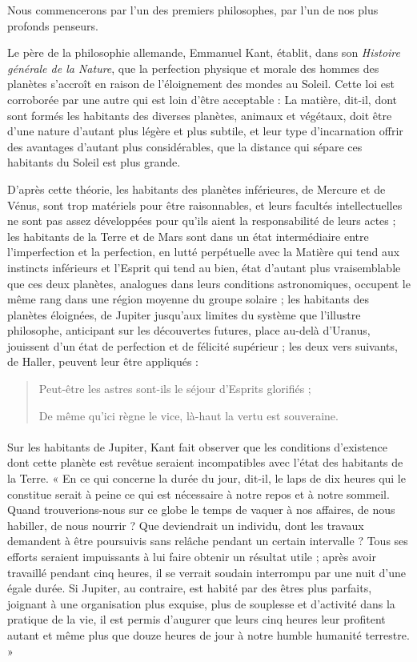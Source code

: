 \documentclass[a4paper, 11pt, oneside]{article}
\begin{document}
Nous commencerons par l'un des premiers philosophes, par l'un de nos plus profonds penseurs.

Le père de la philosophie allemande, Emmanuel Kant, établit, dans son \emph{Histoire générale de la Nature}, que la perfection physique et morale des hommes des planètes s'accroît en raison de l'éloignement des mondes au Soleil. Cette loi est corroborée par une autre qui est loin d'être acceptable : La matière, dit-il, dont sont formés les habitants des diverses planètes, animaux et végétaux, doit être d'une nature d'autant plus légère et plus subtile, et leur type d'incarnation offrir des avantages d'autant plus considérables, que la distance qui sépare ces habitants du Soleil est plus grande.

D'après cette théorie, les habitants des planètes inférieures, de Mercure et de Vénus, sont trop matériels pour être raisonnables, et leurs facultés intellectuelles ne sont pas assez développées pour qu'ils aient la responsabilité de leurs actes ; les habitants de la Terre et de Mars sont dans un état intermédiaire entre l'imperfection et la perfection, en lutté perpétuelle avec la Matière qui tend aux instincts inférieurs et l'Esprit qui tend au bien, état d'autant plus vraisemblable que ces deux planètes, analogues dans leurs conditions astronomiques, occupent le même rang dans une région moyenne du groupe solaire ; les habitants des planètes éloignées, de Jupiter jusqu'aux limites du système que l'illustre philosophe, anticipant sur les découvertes futures, place au-delà d'Uranus, jouissent d'un état de perfection et de félicité supérieur ; les deux vers suivants, de Haller, peuvent leur être appliqués :
\begin{quotation}
\normalsize
Peut-être les astres sont-ils le séjour d'Esprits glorifiés ;

De même qu'ici règne le vice, là-haut la vertu est souveraine.
\end{quotation}
\paragraph{}
Sur les habitants de Jupiter, Kant fait observer que les conditions d'existence dont cette planète est revêtue seraient incompatibles avec l'état des habitants de la Terre. « En ce qui concerne la durée du jour, dit-il, le laps de dix heures qui le constitue serait à peine ce qui est nécessaire à notre repos et à notre sommeil. Quand trouverions-nous sur ce globe le temps de vaquer à nos affaires, de nous habiller, de nous nourrir ? Que deviendrait un individu, dont les travaux demandent à être poursuivis sans relâche pendant un certain intervalle ? Tous ses efforts seraient impuissants à lui faire obtenir un résultat utile ; après avoir travaillé pendant cinq heures, il se verrait soudain interrompu par une nuit d'une égale durée. Si Jupiter, au contraire, est habité par des êtres plus parfaits, joignant à une organisation plus exquise, plus de souplesse et d'activité dans la pratique de la vie, il est permis d'augurer que leurs cinq heures leur profitent autant et même plus que douze heures de jour à notre humble humanité terrestre. »
\end{document}
